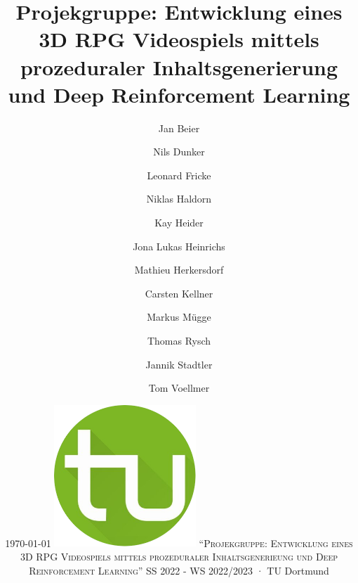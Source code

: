 %
%
\newcommand\svperson{Jan Beier, Nils Dunker, Leonard Fricke, Niklas Haldorn, Kay Heider, \linebreak Jona Lukas Heinrichs, Mathieu Herkersdorf, Carsten Kellner, Markus Mügge, Thomas Rysch, Jannik Stadtler, Tom Voellmer}
\newcommand\svdatum{\today} %
\newcommand\lvname{Projekgruppe: Entwicklung eines 3D RPG Videospiels mittels prozeduraler Inhaltsgenerieung und Deep Reinforcement Learning}
\newcommand\lvtyp{SS 2022 - WS 2022/2023}
\newcommand\lvinst{TU Dortmund}



	
	\title{ \huge\textbf{Projekgruppe: \linebreak \linebreak Entwicklung eines 3D RPG Videospiels mittels prozeduraler Inhaltsgenerierung und Deep Reinforcement Learning} }
	\author{Jan Beier \and Nils Dunker \and Leonard Fricke \and Niklas Haldorn \and Kay Heider \and Jona Lukas Heinrichs \and Mathieu Herkersdorf \and Carsten Kellner \and Markus Mügge \and Thomas Rysch \and Jannik Stadtler \and Tom Voellmer}
	\date{\LARGE{\svdatum} \linebreak \linebreak \normalsize \centering \includegraphics[width=0.4\textwidth]{ressources/tu-dortmund.png} \linebreak \linebreak \large\textsc{"`\lvname"'} \linebreak \linebreak \large{\lvtyp} · \large{\lvinst}}
	
	\maketitle
	\thispagestyle{empty} %
